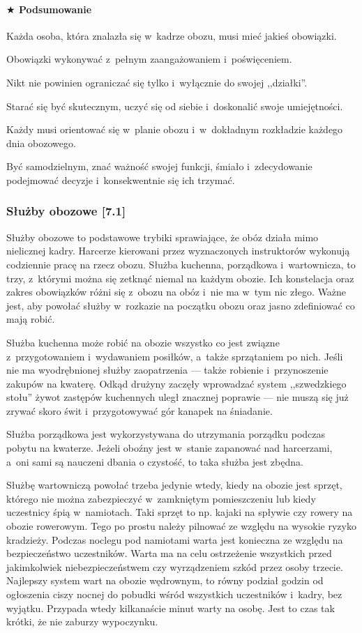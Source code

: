 \documentclass[a5paper,10pt,titlepage,twoside]{article}
\newcommand*{\thecheckbox}{\hss$\Box$} %
\newenvironment*{checklist}
{\list{}{%
\renewcommand*{\makelabel}[1]{\thecheckbox}}}
{\endlist}
\begin{document}
\paragraph{$\bigstar$ Podsumowanie}
\begin{checklist}
\item Każda osoba, która znalazła się w~kadrze obozu, musi mieć jakieś obowiązki.
\item Obowiązki wykonywać z~pełnym zaangażowaniem i~poświęceniem.
\item Nikt nie powinien ograniczać się tylko i~wyłącznie do swojej ,,działki''.
\item Starać się być skutecznym, uczyć się od siebie i~doskonalić swoje umiejętności.
\item Każdy musi orientować się w~planie obozu i~w~dokładnym rozkładzie każdego dnia obozowego.
\item Być samodzielnym, znać ważność swojej funkcji, śmiało i~zdecydowanie podejmować decyzje i~konsekwentnie się ich trzymać.
\end{checklist}
\subsubsection{Służby obozowe [7.1]}
Służby obozowe to podstawowe trybiki sprawiające, że obóz działa mimo nielicznej kadry. Harcerze kierowani przez wyznaczonych instruktorów wykonują codziennie pracę na rzecz obozu. Służba kuchenna, porządkowa i~wartownicza, to trzy, z~którymi można się zetknąć niemal na każdym obozie. Ich konstelacja oraz zakres obowiązków różni się z~obozu na obóz i~nie ma w~tym nic złego. Ważne jest, aby powołać służby w~rozkazie na początku obozu oraz jasno zdefiniować co mają robić.

Służba kuchenna może robić na obozie wszystko co jest związne z~przygotowaniem i~wydawaniem posiłków, a~także sprzątaniem po nich. Jeśli nie ma wyodrębnionej służby zaopatrzenia --- także robienie i~przynoszenie zakupów na kwaterę. Odkąd drużyny zaczęły wprowadzać system ,,szwedzkiego stołu'' żywot zastępów kuchennych uległ znacznej poprawie --- nie muszą się już zrywać skoro świt i~przygotowywać gór kanapek na śniadanie.

Służba porządkowa jest wykorzystywana do utrzymania porządku podczas pobytu na kwaterze. Jeżeli oboźny jest w~stanie zapanować nad harcerzami, a~oni sami są nauczeni dbania o czystość, to taka służba jest zbędna.

Służbę wartowniczą powołać trzeba jedynie wtedy, kiedy na obozie jest sprzęt, którego nie można zabezpieczyć w~zamkniętym pomieszczeniu lub kiedy uczestnicy śpią w~namiotach. Taki sprzęt to np. kajaki na spływie czy rowery na obozie rowerowym. Tego po prostu należy pilnować ze względu na wysokie ryzyko kradzieży. Podczas noclegu pod namiotami warta jest konieczna ze względu na bezpieczeństwo uczestników. Warta ma na celu ostrzeżenie wszystkich przed jakimkolwiek niebezpieczeństwem czy wyrządzeniem szkód przez osoby trzecie. Najlepszy system wart na obozie wędrownym, to równy podział godzin od ogłoszenia ciszy nocnej do pobudki wśród wszystkich uczestników i~kadry, bez wyjątku. Przypada wtedy kilkanaście minut warty na osobę. Jest to czas tak krótki, że nie zaburzy wypoczynku.
\end{document}
